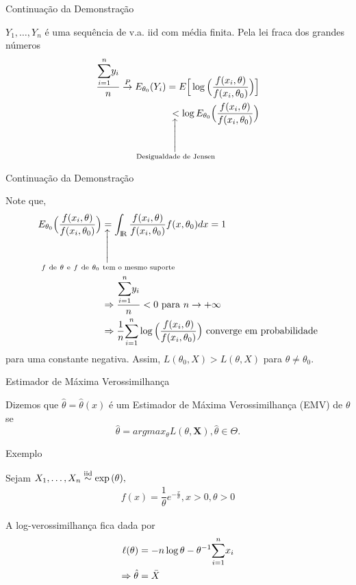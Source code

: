 \documentclass[12pt]{beamer}
\begin{document}
\begin{frame}{Continuação da Demonstração}
\begin{block}{}
\justifying
$Y_{1},\ldots,Y_{n}$ é uma sequência de v.a. iid com média finita. Pela lei fraca dos grandes números
\begin{align*}
    \dfrac{\Sumi y_{i}}{n}\ConvP E_{\theta_{0}}(Y_{i})=E\Big[\log{\Big(\dfrac{f(x_{i},\theta)}{f(x_{i},\theta_{0})}\Big)}\Big]\\
    \SetaUP{\text{Desigualdade de Jensen}}{<}\log{E_{\theta_{0}}\Big(\dfrac{f(x_{i},\theta)}{f(x_{i},\theta_{0})}\Big)}
\end{align*}
\end{block}
\end{frame}

\begin{frame}{Continuação da Demonstração}
\begin{block}{}
\justifying
Note que,
\begin{align*}
E_{\theta_{0}}\Big(\dfrac{f(x_{i},\theta)}{f(x_{i},\theta_{0})}\Big)&\SetaUP{f~\text{de}~\theta~\text{e}~f~\text{de}~\theta_{0}~\text{tem o mesmo suporte}}{=}\int_{\R} \dfrac{f(x_{i},\theta)}{f(x_{i},\theta_{0})}f(x,\theta_{0})dx=1\\
&\Rightarrow \dfrac{\Sumi y_{i}}{n}<0~\text{para}~n\rightarrow +\infty\\
&\Rightarrow \dfrac{1}{n}\Sumi\log{\Big(\dfrac{f(x_{i},\theta)}{f(x_{i},\theta_{0})}\Big)}~\text{converge em probabilidade}
\end{align*}
para uma constante negativa. Assim, $L(\theta_{0},X)>L(\theta,X)$ para $\theta\neq\theta_{0}.$
\end{block}
\end{frame}

\begin{frame}{Estimador de Máxima Verossimilhança}
\begin{definicao}\label{def6}
Dizemos que $\hat{\theta}=\hat{\theta}(x)$ é um Estimador de Máxima Verossimilhança (EMV) de $\theta$ se  $$\hat{\theta}=argmax_{\theta} L(\theta,\boldsymbol{X}), \hat{\theta}\in \Theta.$$
\end{definicao}
\end{frame}

\begin{frame}{Exemplo}
\begin{block}{}
\justifying
Sejam $X_{1},\ldots,X_{n}\overset{\text{iid}}{\sim} \exp{(\theta)},$ 
\begin{align*}
    f(x)=\dfrac{1}{\theta}e^{-\frac{x}{\theta}},x>0,\theta>0
\end{align*}
\end{block}
\pause
\begin{block}{}
\justifying
A log-verossimilhança fica dada por 
\begin{align*}
    \ell(\theta)&=-n\log{\theta}-\theta^{-1}{\displaystyle \sum_{i=1}^{n}} x_{i}\\
    \Rightarrow \hat{\theta}&=\Bar{X}
\end{align*}
\end{block}
\end{frame}
\end{document}
